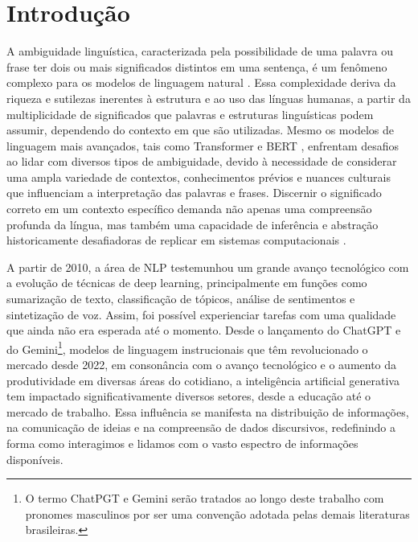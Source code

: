 \section{Introdução}\label{sec-intro}

A ambiguidade linguística, caracterizada pela possibilidade de uma palavra ou frase ter dois ou mais significados distintos em uma sentença, é um fenômeno complexo para os modelos de linguagem natural \cite{ortega2023linguistic}. Essa complexidade deriva da riqueza e sutilezas inerentes à estrutura e ao uso das línguas humanas, a partir da multiplicidade de significados que palavras e estruturas linguísticas podem assumir, dependendo do contexto em que são utilizadas. Mesmo os modelos de linguagem mais avançados, tais como Transformer \cite{vaswani2017attention} e BERT \cite{devlin2018bert}, enfrentam desafios ao lidar com diversos tipos de ambiguidade, devido à necessidade de considerar uma ampla variedade de contextos, conhecimentos prévios e nuances culturais que influenciam a interpretação das palavras e frases. Discernir o significado correto em um contexto específico demanda não apenas uma compreensão profunda da língua, mas também uma capacidade de inferência e abstração historicamente desafiadoras de replicar em sistemas computacionais \cite{ortega2023linguistic}. %


A partir de 2010, a área de NLP testemunhou um grande avanço tecnológico com a evolução de técnicas de deep learning, principalmente em funções como sumarização de texto, classificação de tópicos, análise de sentimentos e sintetização de voz. Assim, foi possível experienciar tarefas com uma qualidade que ainda não era esperada até o momento. Desde o lançamento do ChatGPT e do Gemini\footnote[1]{O termo ChatPGT e Gemini serão tratados ao longo deste trabalho com pronomes masculinos por ser uma convenção adotada pelas demais literaturas brasileiras.}, modelos de linguagem instrucionais que têm revolucionado o mercado desde 2022, em consonância com o avanço tecnológico e o aumento da produtividade em diversas áreas do cotidiano, a inteligência artificial generativa tem impactado significativamente diversos setores, desde a educação até o mercado de trabalho. Essa influência se manifesta na distribuição de informações, na comunicação de ideias e na compreensão de dados discursivos, redefinindo a forma como interagimos e lidamos com o vasto espectro de informações disponíveis. 



